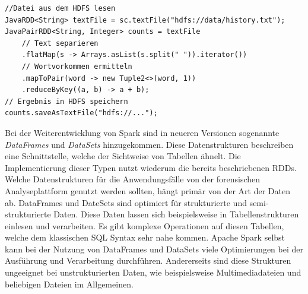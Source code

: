 \begin{lstlisting}[label={lst:spark_rdd_word_count},caption= Beispielimplementierung eines Spark RDDs ,captionpos=b,frame=single,style=customjava]
//Datei aus dem HDFS lesen
JavaRDD<String> textFile = sc.textFile("hdfs://data/history.txt");
JavaPairRDD<String, Integer> counts = textFile
    // Text separieren
    .flatMap(s -> Arrays.asList(s.split(" ")).iterator())
    // Wortvorkommen ermitteln
    .mapToPair(word -> new Tuple2<>(word, 1))
    .reduceByKey((a, b) -> a + b);
// Ergebnis in HDFS speichern
counts.saveAsTextFile("hdfs://...");
\end{lstlisting}


\noindent
Bei der Weiterentwicklung von Spark sind in neueren Versionen sogenannte \textit{DataFrames} und \textit{DataSets} hinzugekommen. Diese Datenstrukturen beschreiben eine Schnittstelle, welche der Sichtweise von Tabellen ähnelt. Die Implementierung dieser Typen nutzt wiederum die bereits beschriebenen RDDs.\\
Welche Datenstrukturen für die Anwendungsfälle von der forensischen Analyseplattform genutzt werden sollten, hängt primär von der Art der Daten ab.
DataFrames und DateSets sind optimiert für strukturierte und semi-strukturierte Daten. Diese Daten lassen sich beispielsweise in Tabellenstrukturen einlesen und verarbeiten. Es gibt komplexe Operationen auf diesen Tabellen, welche dem klassischen SQL Syntax sehr nahe kommen. Apache Spark selbst kann bei der Nutzung von DataFrames und DataSets viele Optimierungen bei der Ausführung und Verarbeitung durchführen. Andererseits sind diese Strukturen ungeeignet bei unstrukturierten Daten, wie beispielsweise Multimediadateien und beliebigen Dateien im Allgemeinen.\cite[S. 66 ff.]{data_processing_spark2}\\

